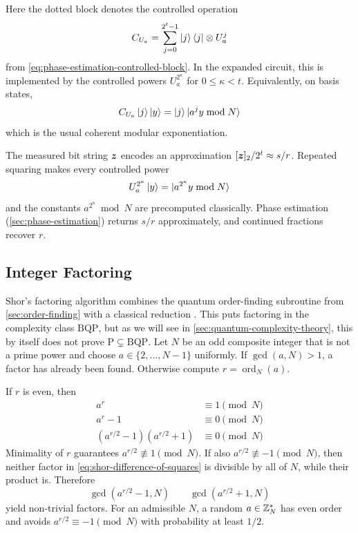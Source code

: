 
Here the dotted block denotes the controlled operation
\[
C_{U_a}
=
\sum_{j=0}^{2^t-1}
\ket j\bra j
\otimes
U_a^j
\]
from \eqref{eq:phase-estimation-controlled-block}.
In the expanded circuit, this is implemented by the controlled powers
\(
U_a^{2^\kappa}
\)
for \(0\leq\kappa<t\).
Equivalently, on basis states,
\[
C_{U_a}\ket j\ket y
=
\ket j\ket{a^jy\bmod N}
\]
which is the usual coherent modular exponentiation.
\pagebreak[3]

The measured bit string
\(
{\boldsymbol{z}}
\)
encodes an approximation
\(
[{\boldsymbol{z}}]_2/2^t\approx s/r
\).
Repeated squaring makes every controlled power 
\[
U_a^{2^\kappa}\ket y
=
\ket{a^{2^\kappa}y\bmod N}
\]
and the constants
\(
a^{2^\kappa}\bmod N
\)
are precomputed classically.
Phase estimation (\autoref{sec:phase-estimation}) returns
\(
s/r
\)
approximately, and continued fractions recover \(r\).

\subsection{Integer Factoring}\label{sec:shor-factoring}

Shor's factoring algorithm combines the quantum order-finding subroutine from \autoref{sec:order-finding} with a classical reduction \cite{shorAlgorithms,laneveQuantumAlgorithms}.
This puts factoring in the complexity class \(\mathrm{BQP}\), but as we will see in \autoref{sec:quantum-complexity-theory}, this by itself does not prove \(\mathrm{P}\subsetneq\mathrm{BQP}\).
Let \(N\) be an odd composite integer that is not a prime power and choose
\(
a\in\{2,\ldots,N-1\}
\)
uniformly.
If
\(
\gcd(a,N)>1
\),
a factor has already been found.
Otherwise compute
\(
r=\operatorname{ord}_N(a)
\).

If \(r\) is even, then
\begin{equation}\label{eq:shor-difference-of-squares}
\begin{aligned}
a^r
&\equiv
1
\pmod N
\\
a^r-1
&\equiv
0
\pmod N
\\
(a^{r/2}-1)
(a^{r/2}+1)
&\equiv
0
\pmod N
\end{aligned}
\end{equation}
Minimality of \(r\) guarantees
\(
a^{r/2}\not\equiv1\pmod N
\).
If also
\(
a^{r/2}\not\equiv-1\pmod N
\),
then neither factor in \autoref{eq:shor-difference-of-squares} is divisible by all of \(N\), while their product is.
Therefore
\begin{equation}\label{eq:shor-factor-gcds}
\gcd(a^{r/2}-1,N)
\qquad
\gcd(a^{r/2}+1,N)
\end{equation}
yield non-trivial factors.
For an admissible \(N\), a random
\(
a\in\mathbb{Z}_N^*
\)
has even order and avoids
\(
a^{r/2}\equiv-1\pmod N
\)
with probability at least \(1/2\).

